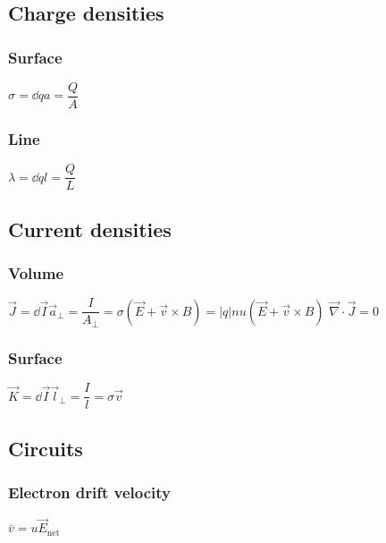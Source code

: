 		\subsection{Charge densities}
        
\subsubsection{Surface}
\begin{itemize}
\itemt \( \sigma = \dd{q}{a} = \dfrac{Q}{A} \)
\end{itemize}
\subsubsection{Line}
\begin{itemize}
\itemt \( \lambda = \dd{q}{l} = \dfrac{Q}{L} \) 
\end{itemize}

		\subsection{Current densities}
        
\subsubsection{Volume}
\begin{itemize}
\itemt \( \vec{J} = \dd{\vec{I}}{\vec{a}_\perp} = \dfrac{I}{A_\perp} = \sigma(\vec{E}+\vec{v}\times B) = |q|nu (\vec{E}+\vec{v}\times B)\)
\itemt \( \vec{\nabla} \cdot \vec{J} = 0 \)
\end{itemize}

\subsubsection{Surface}
\begin{itemize}
\itemt \( \vec{K} = \dd{\vec{I}}{\vec{l}_\perp} = \dfrac{I}{l} = \sigma \vec{v}\)
\end{itemize}




		\subsection{Circuits}

\subsubsection{Electron drift velocity}
\begin{itemize}
\itemt \( \bar{v} = u\vec{E}_\mathrm{net} \)
\end{itemize}	

